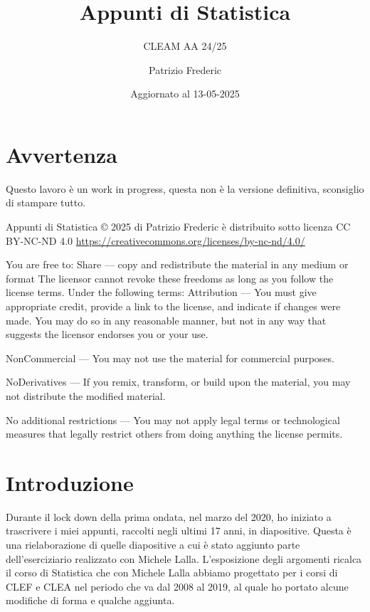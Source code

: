 \documentclass[
  11pt,
]{book}
\title{Appunti di Statistica}
\subtitle{CLEAM AA 24/25}
\author{Patrizio Frederic}
\date{Aggiornato al 13-05-2025}
\theoremstyle{mytheoremstyle}
\theoremstyle{mydefstyle}
\begin{document}
\maketitle

{
\setcounter{tocdepth}{2}
\tableofcontents
}
\chapter*{Avvertenza}\label{avvertenza}

\large

Questo lavoro è un work in progress, questa non è la versione definitiva, sconsiglio di stampare tutto.

\normalsize

Appunti di Statistica © 2025 di Patrizio Frederic è distribuito
sotto licenza CC BY-NC-ND 4.0
\url{https://creativecommons.org/licenses/by-nc-nd/4.0/}

You are free to:
Share --- copy and redistribute the material in any medium or format
The licensor cannot revoke these freedoms as long as you follow the license terms.
Under the following terms:
Attribution --- You must give appropriate credit, provide a link to the license, and indicate if changes were made. You may do so in any reasonable manner, but not in any way that suggests the licensor endorses you or your use.

NonCommercial --- You may not use the material for commercial purposes.

NoDerivatives --- If you remix, transform, or build upon the material, you may not distribute the modified material.

No additional restrictions --- You may not apply legal terms or technological measures that legally restrict others from doing anything the license permits.

\chapter*{Introduzione}\label{introduzione}

Durante il lock down della prima ondata, nel marzo del 2020, ho iniziato a trascrivere
i miei appunti, raccolti negli ultimi 17 anni, in diapositive. Questa è una rielaborazione
di quelle diapositive a cui è stato aggiunto parte dell'eserciziario realizzato con Michele Lalla.
L'esposizione degli argomenti ricalca il corso di Statistica che con Michele Lalla abbiamo
progettato per i corsi di CLEF e CLEA nel periodo che va dal 2008 al 2019, al quale ho
portato alcune modifiche di forma e qualche aggiunta.
\end{document}
